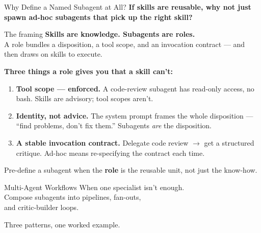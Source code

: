 \documentclass[aspectratio=169, 11pt]{beamer}
\begin{document}
\begin{frame}{Why Define a Named Subagent at All?}
  \textbf{If skills are reusable, why not just spawn ad-hoc subagents that pick up the right skill?}

  \vspace{0.4em}
  \begin{block}{The framing}
    \textbf{Skills are knowledge. Subagents are roles.}\\
    A role bundles a disposition, a tool scope, and an invocation contract --- and then draws on skills to execute.
  \end{block}

  \vspace{0.3em}
  \textbf{Three things a role gives you that a skill can't:}
  \begin{enumerate}
    \item \textbf{Tool scope --- enforced.} A code-review subagent has read-only access, no bash. Skills are advisory; tool scopes aren't.
    \item \textbf{Identity, not advice.} The system prompt frames the whole disposition --- ``find problems, don't fix them.'' Subagents \textit{are} the disposition.
    \item \textbf{A stable invocation contract.} Delegate code review $\to$ get a structured critique. Ad-hoc means re-specifying the contract each time.
  \end{enumerate}

  \vspace{0.3em}
  \alert{\small Pre-define a subagent when the \textbf{role} is the reusable unit, not just the know-how.}
\end{frame}


\begin{frame}{Multi-Agent Workflows}
  \centering
  \vspace{2em}
  {\Large When one specialist isn't enough.\\[0.3em]
  Compose subagents into pipelines, fan-outs,\\[0.3em]
  and critic-builder loops.}

  \vspace{2em}
  Three patterns, one worked example.
\end{frame}
\end{document}
